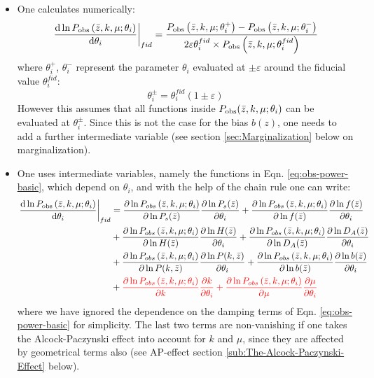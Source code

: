 \begin{itemize}
	\item One calculates numerically: 
	\begin{equation}
	\left.\frac{\mbox{d}\ln P_{{\rm obs}}\left(\bar{z},k,\mu;\theta_{i}\right)}{\mbox{d}\theta_{i}}\right|_{fid}=\frac{P_{{\rm obs}}\left(\bar{z},k,\mu;\theta_{i}^{+}\right)-P_{{\rm obs}}\left(\bar{z},k,\mu;\theta_{i}^{-}\right)}{2\varepsilon\theta_{i}^{fid}\times P_{{\rm obs}}\left(\bar{z},k,\mu;\theta_{i}^{fid}\right)}
	\end{equation}
	where $\theta_{i}^{+}$, $\theta_{i}^{-}$ represent the parameter
	$\theta_{i}$ evaluated at $\pm\varepsilon$ around the fiducial value
	$\theta_{i}^{fid}$:
	\begin{equation}
	\theta_{i}^{\pm}=\theta_{i}^{fid}(1\pm\varepsilon)
	\end{equation}
	However this assumes that all functions inside $P_{{\rm obs}}(\bar{z},k,\mu;\theta_{i})$
	can be evaluated at $\theta_{i}^{\pm}$. Since this is not the case
	for the bias $b(z)$, one needs to add a further intermediate variable
	(see section \ref{sec:Marginalization} below on marginalization).
	\item One uses intermediate variables, namely the functions in Eqn. \ref{eq:obs-power-basic},
	which depend on $\theta_{i}$, and with the help of the chain rule
	one can write:
	\begin{align}
	\left.\frac{\mbox{d}\ln P_{{\rm obs}}\left(\bar{z},k,\mu;\theta_{i}\right)}{\mbox{d}\theta_{i}}\right|_{fid} & =\frac{\partial\ln P_{obs}\left(\bar{z},k,\mu;\theta_{i}\right)}{\partial\ln P_{s}(\bar{z})}\frac{\partial\ln P_{s}(\bar{z})}{\partial\theta_{i}}+\frac{\partial\ln P_{obs}\left(\bar{z},k,\mu;\theta_{i}\right)}{\partial\ln f(\bar{z})}\frac{\partial\ln f(\bar{z})}{\partial\theta_{i}}\nonumber \\
	& +\frac{\partial\ln P_{obs}\left(\bar{z},k,\mu;\theta_{i}\right)}{\partial\ln H(\bar{z})}\frac{\partial\ln H(\bar{z})}{\partial\theta_{i}}+\frac{\partial\ln P_{obs}\left(\bar{z},k,\mu;\theta_{i}\right)}{\partial\ln D_{A}(\bar{z})}\frac{\partial\ln D_{A}(\bar{z})}{\partial\theta_{i}}\nonumber \\
	& +\frac{\partial\ln P_{obs}\left(\bar{z},k,\mu;\theta_{i}\right)}{\partial\ln P(k,\bar{z})}\frac{\partial\ln P(k,\bar{z})}{\partial\theta_{i}}+\frac{\partial\ln P_{obs}\left(\bar{z},k,\mu;\theta_{i}\right)}{\partial\ln b(\bar{z})}\frac{\partial\ln b(\bar{z})}{\partial\theta_{i}}\label{eq:derivatives-of-lnPobs}\\
	& +{\color{red}\frac{\partial\ln P_{obs}\left(\bar{z},k,\mu;\theta_{i}\right)}{\partial k}\frac{\partial k}{\partial\theta_{i}}+\frac{\partial\ln P_{obs}\left(\bar{z},k,\mu;\theta_{i}\right)}{\partial\mu}\frac{\partial\mu}{\partial\theta_{i}}}\nonumber 
	\end{align}
	where we have ignored the dependence on the damping terms of Eqn.
	\ref{eq:obs-power-basic} for simplicity. The last two terms are non-vanishing
	if one takes the Alcock-Paczynski effect into account for $k$ and
	$\mu$, since they are affected by geometrical terms also (see AP-effect
	section \ref{sub:The-Alcock-Paczynski-Effect} below).
\end{itemize}
